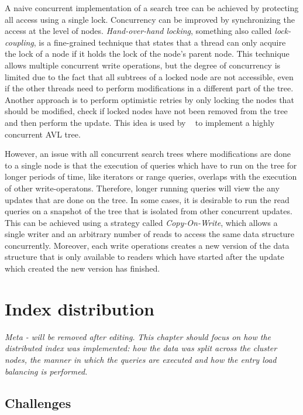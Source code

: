 \documentclass[11pt,a4paper]{globis-book}
\begin{document}
A naive concurrent implementation of a search tree can be achieved by protecting all access using a single lock. Concurrency can be improved by synchronizing the access at the level of nodes. \textit{Hand-over-hand locking}, something also called \textit{lock-coupling}, is a fine-grained technique that states that a thread can only acquire the lock of a node if it holds the lock of the node's parent node. This technique allows multiple concurrent write operations, but the degree of concurrency is limited due to the fact that all subtrees of a locked node are not accessible, even if the other threads need to perform modifications in a different part of the tree. Another approach is to perform optimistic retries by only locking the nodes that should be modified, check if locked nodes have not been removed from the tree and then perform the update. This idea is used by ~\cite{Bronson2010concurrent} to implement a highly concurrent AVL tree.

However, an issue with all concurrent search trees where modifications are done to a single node is that the execution of queries which have to run on the tree for longer periods of time, like iterators or range queries, overlaps with the execution of other write-operatons. Therefore, longer running queries will view the any updates that are done on the tree. In some cases, it is desirable to run the read queries on a snapshot of the tree that is isolated from other concurrent updates. This can be achieved using a strategy called \textit{Copy-On-Write}, which allows a single writer and an arbitrary number of reads to access the same data structure concurrently. Moreover, each write operations creates a new version of the data structure that is only available to readers which have started after the update which created the new version has finished. 

\chapter{Index distribution}
\label{ch:distindex}

\textit{Meta - will be removed after editing.}
\textit{This chapter should focus on how the distributed index was implemented: how the data was split across the cluster nodes, the manner in which the queries are executed and how the entry load balancing is performed.} 

\section{Challenges}
\label{sec:distindex-challenges}
\end{document}
